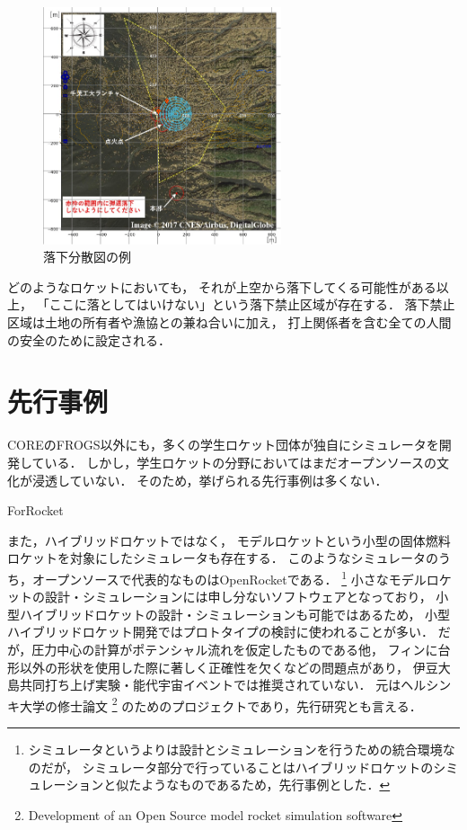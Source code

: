 \documentclass[a4j,10pt]{jsarticle}
\begin{document}
\begin{figure}[htbp]
	\begin{center}
		\includegraphics[width=7cm]{./ghp-example.png}
		\caption{落下分散図の例}
		\label{ghp-example}
	\end{center}
\end{figure}

どのようなロケットにおいても，
それが上空から落下してくる可能性がある以上，
「ここに落としてはいけない」という落下禁止区域が存在する．
落下禁止区域は土地の所有者や漁協との兼ね合いに加え，
打上関係者を含む全ての人間の安全のために設定される．


\section{先行事例}

COREのFROGS以外にも，多くの学生ロケット団体が独自にシミュレータを開発している．
しかし，学生ロケットの分野においてはまだオープンソースの文化が浸透していない．
そのため，挙げられる先行事例は多くない．

ForRocket

また，ハイブリッドロケットではなく，
モデルロケットという小型の固体燃料ロケットを対象にしたシミュレータも存在する．
このようなシミュレータのうち，オープンソースで代表的なものはOpenRocketである．
\footnote{シミュレータというよりは設計とシミュレーションを行うための統合環境なのだが，
シミュレータ部分で行っていることはハイブリッドロケットのシミュレーションと似たようなものであるため，先行事例とした．}
小さなモデルロケットの設計・シミュレーションには申し分ないソフトウェアとなっており，
小型ハイブリッドロケットの設計・シミュレーションも可能ではあるため，
小型ハイブリッドロケット開発ではプロトタイプの検討に使われることが多い．
だが，圧力中心の計算がポテンシャル流れを仮定したものである他，
フィンに台形以外の形状を使用した際に著しく正確性を欠くなどの問題点があり，
伊豆大島共同打ち上げ実験・能代宇宙イベントでは推奨されていない．
元はヘルシンキ大学の修士論文
\footnote{Development of an Open Source model rocket simulation
software}
のためのプロジェクトであり，先行研究とも言える．
\end{document}
